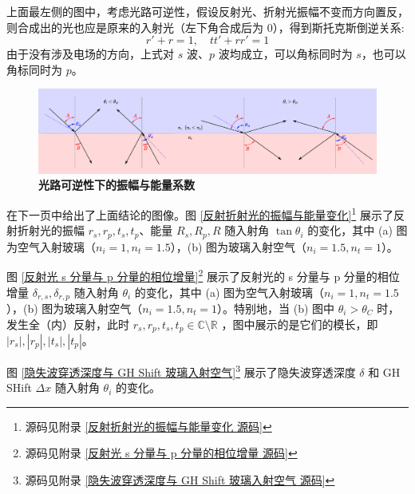 \documentclass[UTF8]{report}
\def\R{\mathbb{R}}
\def\C{\mathbb{C}}
\theoremstyle{MyLineTheoremStyle} %
\theoremstyle{MyBlockTheoremStyle} %
\theoremstyle{MySubsubsectionStyle} %
\begin{document}
上面最左侧的图中，考虑光路可逆性，假设反射光、折射光振幅不变而方向置反，则合成出的光也应是原来的入射光（左下角合成后为 0），得到斯托克斯倒逆关系: 
\begin{equation}\label{斯托克斯倒逆关系}
r' + r = 1,\quad tt' + rr' = 1
\end{equation}
由于没有涉及电场的方向，上式对 $s$ 波、$p$ 波均成立，可以角标同时为 $s$，也可以角标同时为 $p$。


\begin{figure}[H]\centering
\includegraphics[width=\columnwidth]{assets/3/光路可逆性下的振幅与能量系数.pdf}
\caption{\bfseries 光路可逆性下的振幅与能量系数}\label{光路可逆性下的振幅与能量系数}
\end{figure}

在下一页中给出了上面结论的图像。图 \ref{反射折射光的振幅与能量变化}\footnote{源码见附录 \ref{反射折射光的振幅与能量变化 源码}} 展示了反射折射光的振幅 $r_s, r_p, t_s, t_p$、能量 $R_s, R_p, R$ 随入射角 $\tan \theta_i$ 的变化，其中 (a) 图为空气入射玻璃（$n_i = 1, n_t = 1.5$），(b) 图为玻璃入射空气（$n_i = 1.5, n_t = 1$）。

图 \ref{反射光 s 分量与 p 分量的相位增量}\footnote{源码见附录 \ref{反射光 s 分量与 p 分量的相位增量 源码}} 展示了反射光的 s 分量与 p 分量的相位增量 $\delta_{r,s}, \delta_{r,p}$ 随入射角 $\theta_i$ 的变化，其中 (a) 图为空气入射玻璃（$n_i = 1, n_t = 1.5$），(b) 图为玻璃入射空气（$n_i = 1.5, n_t = 1$）。特别地，当 (b) 图中 $\theta_i > \theta_C$ 时，发生全（内）反射，此时 $r_s, r_p, t_s, t_p \in \C \setminus \R$ ，图中展示的是它们的模长，即 $|r_s|, |r_p|, |t_s|, |t_p|$。

图 \ref{隐失波穿透深度与 GH Shift 玻璃入射空气}\footnote{源码见附录 \ref{隐失波穿透深度与 GH Shift 玻璃入射空气 源码}} 展示了隐失波穿透深度 $\delta$ 和 GH SHift $\Delta x$ 随入射角 $\theta_i$ 的变化。
\end{document}
